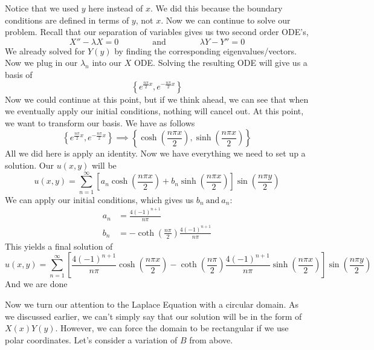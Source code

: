 Notice that we used $y$ here instead of $x$. We did this because the boundary conditions are defined in terms of $y$, not $x$. Now we can continue to solve our problem. Recall that our separation of variables gives us two second order ODE's,
\[
X'' - \lambda X = 0 \qquad\qquad \text{and} \qquad\qquad \lambda Y - Y'' = 0
\]
We already solved for $Y(y)$ by finding the corresponding eigenvalues/vectors. Now we plug in our $\lambda_{n}$ into our $X$ ODE. Solving the resulting ODE will give us a basis of
\[
\left\{ e^{\frac{n\pi}{2}x}, e^{-\frac{n\pi}{2}x} \right\}
\]
Now we could continue at this point, but if we think ahead, we can see that when we eventually apply our initial conditions, nothing will cancel out. At this point, we want to transform our basis. We have as follows
\[
\left\{ e^{\frac{n\pi}{2}x}, e^{-\frac{n\pi}{2}x} \right\} \implies \left\{ \cosh{\left(\frac{n\pi x}{2}\right)}, \sinh{\left(\frac{n\pi x}{2}\right)} \right\}
\]
All we did here is apply an identity. Now we have everything we need to set up a solution. Our $u(x,y)$ will be
\[
u(x,y) = \sum_{n=1}^{\infty}\left[a_{n}\cosh{\left(\frac{n\pi x}{2}\right)} + b_{n}\sinh{\left(\frac{n\pi x}{2}\right)}\right]\sin{\left(\frac{n\pi y}{2}\right)}
\]
We can apply our initial conditions, which gives us $b_{n}\ \text{and}\ a_{n}$:
\begin{align*}
a_{n} &= \frac{4(-1)^{n+1}}{n\pi}\\
b_{n} &= -\coth{\left(\frac{n \pi}{2}\right)}\frac{4(-1)^{n+1}}{n\pi}
\end{align*}
This yields a final solution of
\[
u(x,y) = \sum_{n=1}^{\infty}\left[ \frac{4(-1)^{n+1}}{n\pi} \cosh{\left(\frac{n\pi x}{2}\right)} -\coth{\left(\frac{n \pi}{2}\right)}\frac{4(-1)^{n+1}}{n\pi}\sinh{\left(\frac{n\pi x}{2}\right)}\right]\sin{\left(\frac{n\pi y}{2}\right)}
\]
And we are done
\newpage


\indent Now we turn our attention to the Laplace Equation with a circular domain. As we discussed earlier, we can't simply say that our solution will be in the form of $X(x)Y(y)$. However, we can force the domain to be rectangular if we use polar coordinates. Let's consider a variation of $B$ from above.\\\\

